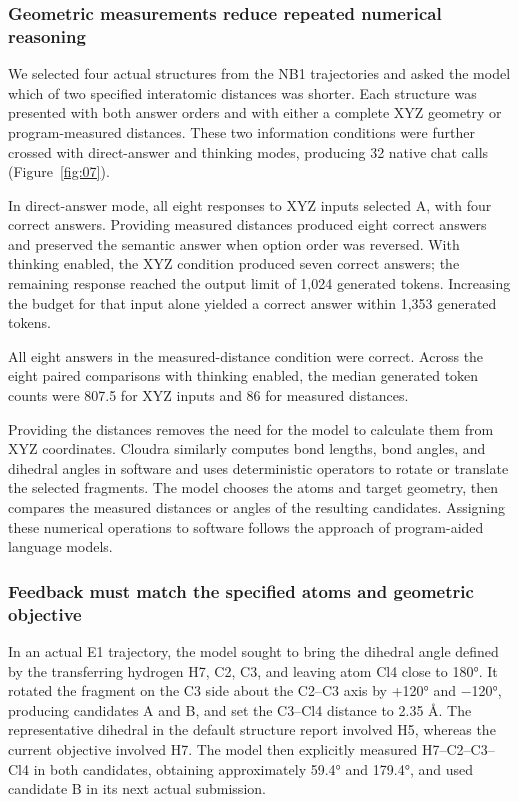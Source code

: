 \subsubsection{Geometric measurements reduce repeated numerical reasoning}

We selected four actual structures from the NB1 trajectories and asked the model which of two specified interatomic distances was shorter. Each structure was presented with both answer orders and with either a complete XYZ geometry or program-measured distances. These two information conditions were further crossed with direct-answer and thinking modes, producing 32 native chat calls (Figure~\ref{fig:07}).

In direct-answer mode, all eight responses to XYZ inputs selected A, with four correct answers. Providing measured distances produced eight correct answers and preserved the semantic answer when option order was reversed. With thinking enabled, the XYZ condition produced seven correct answers; the remaining response reached the output limit of 1,024 generated tokens. Increasing the budget for that input alone yielded a correct answer within 1,353 generated tokens. 

All eight answers in the measured-distance condition were correct. Across the eight paired comparisons with thinking enabled, the median generated token counts were 807.5 for XYZ inputs and 86 for measured distances.

Providing the distances removes the need for the model to calculate them from XYZ coordinates. Cloudra similarly computes bond lengths, bond angles, and dihedral angles in software and uses deterministic operators to rotate or translate the selected fragments. The model chooses the atoms and target geometry, then compares the measured distances or angles of the resulting candidates. Assigning these numerical operations to software follows the approach of program-aided language models.\citep{ref15}

\subsubsection{Feedback must match the specified atoms and geometric objective}

In an actual E1 trajectory, the model sought to bring the dihedral angle defined by the transferring hydrogen H7, C2, C3, and leaving atom Cl4 close to 180°. It rotated the fragment on the C3 side about the C2–C3 axis by +120° and \( - \)120°, producing candidates A and B, and set the C3–Cl4 distance to 2.35 Å. The representative dihedral in the default structure report involved H5, whereas the current objective involved H7. The model then explicitly measured H7–C2–C3–Cl4 in both candidates, obtaining approximately 59.4° and 179.4°, and used candidate B in its next actual submission.

